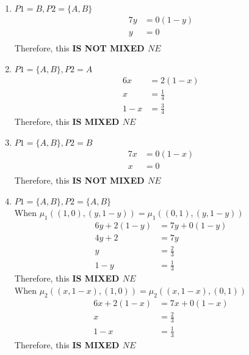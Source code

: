 \documentclass[12pt, a4paper]{article}
\begin{document}
\begin{enumerate}
\item $P1 = B, P2 = \{A,B\}$\\
 \begin{subequations}
  \begin{align}
    7y &= 0(1-y)\\
     y &= 0\\
  \end{align}
\end{subequations}
Therefore, this \textbf{IS NOT MIXED $NE$}

\item $P1 = \{A,B\}, P2 = A$\\
 \begin{subequations}
  \begin{align}
    6x &= 2(1-x)\\
    x &= \frac{1}{4}\\
    1 - x &= \frac{3}{4}
  \end{align}
\end{subequations}
Therefore, this \textbf{IS MIXED $NE$}


\item $P1 = \{A,B\}, P2 = B$\\
 \begin{subequations}
  \begin{align}
    7x &= 0(1-x)\\
     x &= 0\\
  \end{align}
\end{subequations}
Therefore, this \textbf{IS NOT MIXED $NE$}


\item $P1 = \{A,B\}, P2 = \{A,B\}$\\

When $\mu_1((1,0),(y, 1-y)) = \mu_1((0,1),(y,1-y))$
 \begin{subequations}
  \begin{align}
    6y + 2(1-y) &= 7y + 0(1-y)\\
    4y + 2 &= 7y\\
    y &= \frac{2}{3}\\
    1-y &= \frac{1}{3}
  \end{align}
\end{subequations}
Therefore, this \textbf{IS MIXED $NE$}\\

When $\mu_2((x,1-x),(1,0)) = \mu_2((x,1-x),(0,1))$
 \begin{subequations}
  \begin{align}
    6x + 2(1-x) &= 7x + 0(1-x)\\
    x &= \frac{2}{3}\\
    1-x &= \frac{1}{3}
  \end{align}
\end{subequations}
Therefore, this \textbf{IS MIXED $NE$}
\end{enumerate}
\end{document}
